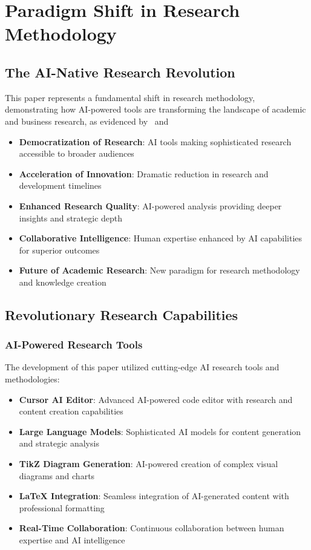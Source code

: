 \documentclass[12pt,a4paper]{book}
\begin{document}
\section{Paradigm Shift in Research Methodology}

\subsection{The AI-Native Research Revolution}

This paper represents a fundamental shift in research methodology, demonstrating how AI-powered tools are transforming the landscape of academic and business research, as evidenced by \ and \:

\begin{itemize}
    \item \textbf{Democratization of Research}: AI tools making sophisticated research accessible to broader audiences
    \item \textbf{Acceleration of Innovation}: Dramatic reduction in research and development timelines
    \item \textbf{Enhanced Research Quality}: AI-powered analysis providing deeper insights and strategic depth
    \item \textbf{Collaborative Intelligence}: Human expertise enhanced by AI capabilities for superior outcomes
    \item \textbf{Future of Academic Research}: New paradigm for research methodology and knowledge creation
\end{itemize}

\subsection{Revolutionary Research Capabilities}

\subsubsection{AI-Powered Research Tools}

The development of this paper utilized cutting-edge AI research tools and methodologies:

\begin{itemize}
    \item \textbf{Cursor AI Editor}: Advanced AI-powered code editor with research and content creation capabilities
    \item \textbf{Large Language Models}: Sophisticated AI models for content generation and strategic analysis
    \item \textbf{TikZ Diagram Generation}: AI-powered creation of complex visual diagrams and charts
    \item \textbf{LaTeX Integration}: Seamless integration of AI-generated content with professional formatting
    \item \textbf{Real-Time Collaboration}: Continuous collaboration between human expertise and AI intelligence
\end{itemize}
\end{document}
